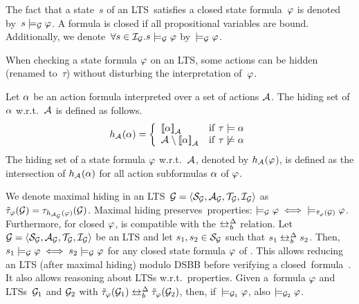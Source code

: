 The fact that a state~$s$ of an LTS~\graph satisfies a closed state formula~$\varphi$ is denoted by~$s \models_\mathcal{G} \varphi$.
A formula is closed if all propositional variables are bound.
Additionally, we denote~$\forall s \in \mathcal{I}_{\mathcal{G}} . s \models_\mathcal{G} \varphi$ by~$\models_\mathcal{G} \varphi$.

When checking a state formula $\varphi$ on an LTS, some actions can be hidden (renamed to~$\tau$) without disturbing the interpretation of~$\varphi$.

\begin{definition}
\label{def:lts-transformation:hiding-set}
Let $\alpha$ be an action formula interpreted over a set of actions ${\mathcal{A}_{}}$.
The hiding set of $\alpha$ w.r.t.\ ${\mathcal{A}_{}}$ is defined as follows.
\[
h_{\mathcal{A}_{}} (\alpha) = \left\{
\begin{array}{ll}
\left[\!\left[ \alpha \right]\!\right]_{\mathcal{A}_{}}                    & {\rm if} ~ \tau \models \alpha \\
{\mathcal{A}_{}} \setminus \left[\!\left[ \alpha \right]\!\right]_{\mathcal{A}_{}} & {\rm if} ~ \tau \not\models \alpha
\end{array}
\right.
\]
The hiding set of a state formula $\varphi$ w.r.t.\ ${\mathcal{A}_{}}$, denoted by $h_{\mathcal{A}_{}} (\varphi$), is defined as the intersection of $h_{\mathcal{A}_{}} (\alpha)$ for all action subformulas $\alpha$ of $\varphi$.
\end{definition}

We denote maximal hiding in an LTS~$\mathcal{G} = \langle {\mathcal{S}_{\ensuremath{\mathcal{G}}}}, {\mathcal{A}_{\mathcal{G}}}, {\mathcal{T}_{\mathcal{G}}}, \mathcal{I}_{\mathcal{G}} \rangle$ as $\tilde\tau_\varphi(\mathcal{G}) = \smash{\tau_{h_{{\mathcal{A}_{\mathcal{G}}}}(\varphi)}(\mathcal{G})}$.
Maximal hiding preserves~\dsbrLmu properties: $\models_\mathcal{G} \varphi \iff \smash{\models_{\tilde\tau_\varphi(\mathcal{G})} \varphi}$.
Furthermore, for closed $\varphi$, \dsbrLmu is compatible with the $\dsbbis$ relation.
Let $\mathcal{G} = \langle {\mathcal{S}_{\ensuremath{\mathcal{G}}}}, {\mathcal{A}_{\mathcal{G}}}, {\mathcal{T}_{\mathcal{G}}}, \mathcal{I}_{\mathcal{G}} \rangle$ be an LTS and let $s_1, s_2 \in {\mathcal{S}_{\ensuremath{\mathcal{G}}}}$ such that $s_1 \dsbbis s_2$.
Then, $s_1 \models_\mathcal{G} \varphi \iff s_2 \models_\mathcal{G} \varphi$ for any closed state formula $\varphi$ of \dsbrLmu.
This allows reducing an LTS (after maximal hiding) modulo DSBB before verifying a closed~\dsbrLmu formula~\cite{mateescu.wijs.propred}.
It also allows reasoning about LTSs w.r.t.\ properties.
Given a~\dsbrLmu formula $\varphi$ and LTSs~$\mathcal{G}_1$ and $\mathcal{G}_2$ with $\maxabstr(\graph_1) \dsbbis \maxabstr(\graph_2)$, then, if~$\models_{\mathcal{G}_1} \varphi$, also $\models_{\mathcal{G}_2} \varphi$. 